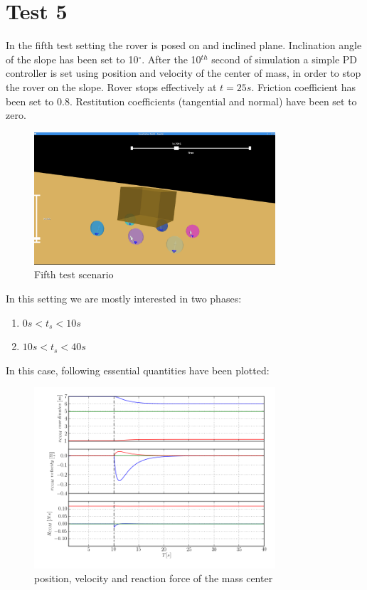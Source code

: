 \newpage
\section{Test 5}
\label{Sec:test_5}

In the fifth test setting the rover is posed on and inclined plane.
Inclination angle of the slope has been set to 10$^\circ$. After the 10$^{th}$ second of simulation a simple PD controller
is set using position and velocity of the center of mass, in order to stop the rover on the slope. Rover stops effectively at $t = 25s$. 
Friction coefficient has been set to 0.8. Restitution coefficients (tangential and normal) have been set to zero. 

\begin{figure}[H]
  \centering
    \includegraphics[width=0.8\textwidth]{run_5}
  \caption{Fifth test scenario}
\end{figure}

\noindent In this setting we are mostly interested in two phases:

\begin{enumerate} 
  \item $0s < t_s < 10s$
  \item $10s < t_s < 40s$
\end{enumerate}

\noindent In this case, following essential quantities have been plotted:

\begin{figure}[H]
  \centering
    \includegraphics[width=0.8\textwidth]{xvpCOM5}
  \caption{position, velocity and reaction force of the mass center}
\end{figure}


